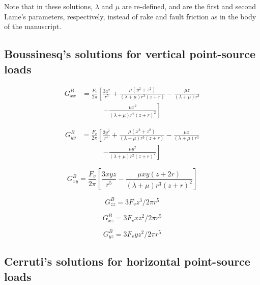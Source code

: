 \documentclass[twocolumn,jgrga]{AGUTeX}
\begin{document}
\begin{article}
{{Note that in these solutions, $\lambda$ and $\mu$ are re-defined, and
are the first and second Lame's parameters, respectively, instead of
rake and fault friction as in the body of the manuscript.

\subsection{Boussinesq's solutions for vertical point-source
loads}\label{boussinesqs-solutions-for-vertical-point-source-loads}

\begin{equation}
\begin{split}
G_{xx}^B & = \frac{ F_v }{ 2\pi } \left[ \frac{ 3x^2 }{ r^5 } \right.
+ \frac{\mu (y^2 + z^2)}{(\lambda + \mu) r^3 (z + r)}
- \frac{\mu z}{(\lambda + \mu) r^3} \\
&\qquad \quad \left. - \frac{\mu x^2}{ (\lambda + \mu) r^2 (z + r)^2 }\right ]
\end{split}
\end{equation}

\begin{equation}
\begin{split}
G_{yy}^B & = \frac{F_v}{2\pi } \left [ \frac{3y^2}{r^5} \right.
+ \frac{\mu (x^{2} + z^{2})}{(\lambda + \mu) r^{3}(z + r)}
- \frac{\mu z}{(\lambda + \mu) r ^{3}} \\
& \qquad \quad \left. - \frac{\mu y^{2}}{(\lambda + \mu ) r^2 (z +r)^2} \right]
\end{split}
\end{equation}

\begin{equation}
G_{xy}^{B} = \frac{F _{v}}{2\pi} \left[ \frac{3xyz}{r^{5}}
- \frac{\mu x y (z + 2r)}{(\lambda + \mu) r^{3} (z + r)^{2}} \right]
\end{equation}

\begin{equation}
G_{zz}^{B} = 3 F _{v} z^{3} / 2 \pi r^{5}
\end{equation}

\begin{equation}
G_{xz}^{B} = 3 F _{v} xz^{2} / 2 \pi r^{5}
\end{equation}

\begin{equation}
G_{yz}^{B} = 3 F _{v} yz^{2} / 2 \pi r^{5}
\end{equation}

\subsection{Cerruti's solutions for horizontal point-source
loads}\label{cerrutis-solutions-for-horizontal-point-source-loads}

}}
\end{article}
\end{document}
